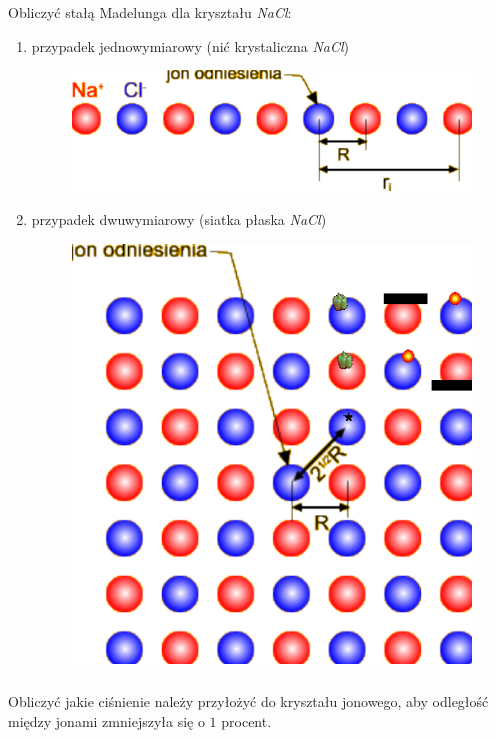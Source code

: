 \subsubsection{}
Obliczyć stałą Madelunga dla kryształu \textit{NaCl}:
\begin{enumerate}
\item przypadek jednowymiarowy (nić krystaliczna \textit{NaCl})
\begin{figure}[h!]
\centering
\includegraphics[scale=0.3]{images/zes2-1}
\end{figure}
\item przypadek dwuwymiarowy (siatka płaska \textit{NaCl})
\begin{figure}[h!]
\centering
\includegraphics[scale=0.5]{images/zes2-2}
\end{figure}
\end{enumerate}

\subsubsection{}
Obliczyć jakie ciśnienie należy przyłożyć do kryształu jonowego, aby odległość między jonami zmniejszyła się o $1$ procent.
